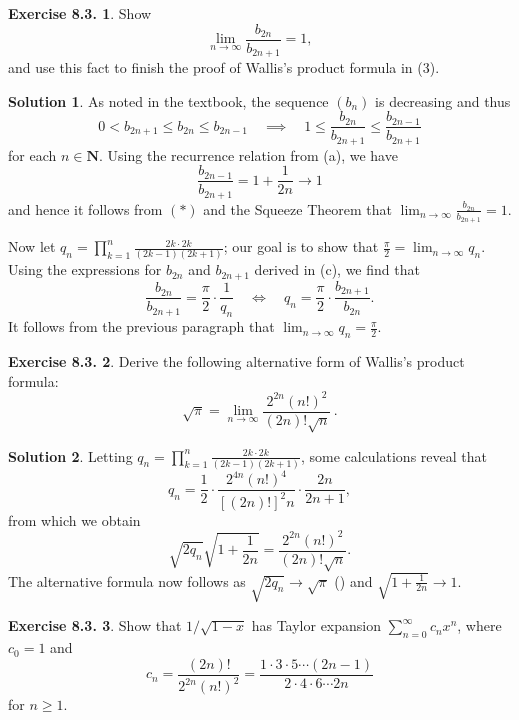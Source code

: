 \documentclass[12pt]{article}
\theoremstyle{definition}
\theoremstyle{exercise}
\newtheorem{exercise}{Exercise 8.3.}
\theoremstyle{solution}
\newtheorem*{solution}{Solution}
\newcommand{\quimplies}{\quad \implies \quad}
\newcommand{\quiff}{\quad \iff \quad}
\newcommand{\N}{\mathbf{N}}
\begin{document}
\begin{exercise}
\label{ex:4}
    Show
    \[
        \lim_{n \to \infty} \frac{b_{2n}}{b_{2n+1}} = 1,
    \]
    and use this fact to finish the proof of Wallis's product formula in (3).
\end{exercise}

\begin{solution}
    As noted in the textbook, the sequence \( (b_n) \) is decreasing and thus
    \[
        0 < b_{2n+1} \leq b_{2n} \leq b_{2n-1} \quimplies 1 \leq \frac{b_{2n}}{b_{2n+1}} \leq \frac{b_{2n-1}}{b_{2n+1}} \tag{\( * \)}
    \]
    for each \( n \in \N \). Using the recurrence relation from  (a), we have
    \[
        \frac{b_{2n-1}}{b_{2n+1}} = 1 + \frac{1}{2n} \to 1
    \]
    and hence it follows from \( (*) \) and the Squeeze Theorem that \( \lim_{n \to \infty} \tfrac{b_{2n}}{b_{2n+1}} = 1 \).

    Now let \( q_n = \prod_{k=1}^n \frac{2k \cdot 2k}{(2k - 1)(2k + 1)} \); our goal is to show that \( \tfrac{\pi}{2} = \lim_{n \to \infty} q_n \). Using the expressions for \( b_{2n} \) and \( b_{2n+1} \) derived in  (c), we find that
    \[
        \frac{b_{2n}}{b_{2n+1}} = \frac{\pi}{2} \cdot \frac{1}{q_n} \quiff q_n = \frac{\pi}{2} \cdot \frac{b_{2n+1}}{b_{2n}}.
    \]
    It follows from the previous paragraph that \( \lim_{n \to \infty} q_n = \tfrac{\pi}{2} \).
\end{solution}

\begin{exercise}
\label{ex:5}
    Derive the following alternative form of Wallis's product formula:
    \[
        \sqrt{\pi} = \lim_{n \to \infty} \frac{2^{2n} (n!)^2}{(2n)! \sqrt{n}} \, .
    \]
\end{exercise}

\begin{solution}
    Letting \( q_n = \prod_{k=1}^n \frac{2k \cdot 2k}{(2k - 1)(2k + 1)} \), some calculations reveal that
    \[
        q_n = \frac{1}{2} \cdot \frac{2^{4n} (n!)^4}{[(2n)!]^2 n} \cdot \frac{2n}{2n + 1},
    \]
    from which we obtain
    \[
        \sqrt{2 q_n} \sqrt{1 + \frac{1}{2n}} = \frac{2^{2n} (n!)^2}{(2n)! \sqrt{n}}.
    \]
    The alternative formula now follows as \( \sqrt{2 q_n} \to \sqrt{\pi} \) () and \( \sqrt{1 + \tfrac{1}{2n}} \to 1 \).
\end{solution}

\begin{exercise}
\label{ex:6}
    Show that \( 1 / \sqrt{1 - x} \) has Taylor expansion \( \sum_{n=0}^{\infty} c_n x^n \), where \( c_0 = 1 \) and
    \[
        c_n = \frac{(2n)!}{2^{2n} (n!)^2} = \frac{1 \cdot 3 \cdot 5 \cdots (2n - 1)}{2 \cdot 4 \cdot 6 \cdots 2n}
    \]
    for \( n \geq 1 \).
\end{exercise}
\end{document}
